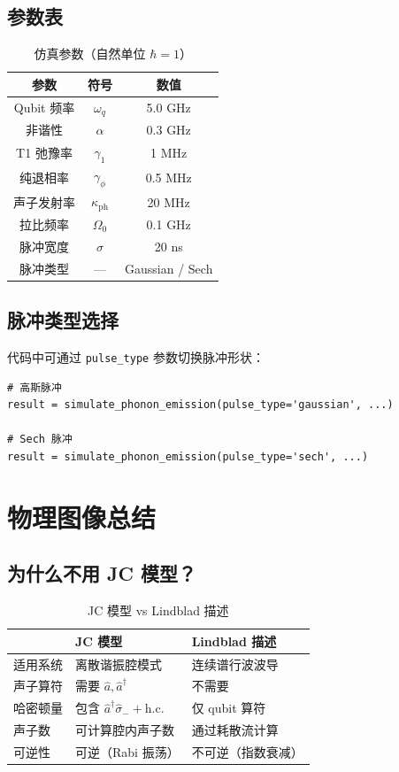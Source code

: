 \documentclass[12pt,a4paper]{article}
\theoremstyle{definition}
\begin{document}
\subsection{参数表}

\begin{table}[h]
\centering
\caption{仿真参数（自然单位 $\hbar=1$）}
\begin{tabular}{ccc}
\toprule
参数 & 符号 & 数值 \\
\midrule
Qubit 频率 & $\omega_q$ & 5.0 GHz \\
非谐性 & $\alpha$ & 0.3 GHz \\
T1 弛豫率 & $\gamma_1$ & 1 MHz \\
纯退相率 & $\gamma_\phi$ & 0.5 MHz \\
声子发射率 & $\kappa_{\text{ph}}$ & 20 MHz \\
拉比频率 & $\Omega_0$ & 0.1 GHz \\
脉冲宽度 & $\sigma$ & 20 ns \\
脉冲类型 & --- & Gaussian / Sech \\
\bottomrule
\end{tabular}
\end{table}

\subsection{脉冲类型选择}

代码中可通过 \texttt{pulse\_type} 参数切换脉冲形状：
\begin{lstlisting}
# 高斯脉冲
result = simulate_phonon_emission(pulse_type='gaussian', ...)

# Sech 脉冲
result = simulate_phonon_emission(pulse_type='sech', ...)
\end{lstlisting}

\section{物理图像总结}

\subsection{为什么不用 JC 模型？}

\begin{table}[h]
\centering
\caption{JC 模型 vs Lindblad 描述}
\begin{tabular}{p{4cm}p{5cm}p{5cm}}
\toprule
& JC 模型 & Lindblad 描述 \\
\midrule
适用系统 & 离散谐振腔模式 & 连续谱行波波导 \\
声子算符 & 需要 $\hat{a}, \hat{a}^\dagger$ & 不需要 \\
哈密顿量 & 包含 $\hat{a}^\dagger\hat{\sigma}_- + \text{h.c.}$ & 仅 qubit 算符 \\
声子数 & 可计算腔内声子数 & 通过耗散流计算 \\
可逆性 & 可逆（Rabi 振荡） & 不可逆（指数衰减） \\
\bottomrule
\end{tabular}
\end{table}
\end{document}
